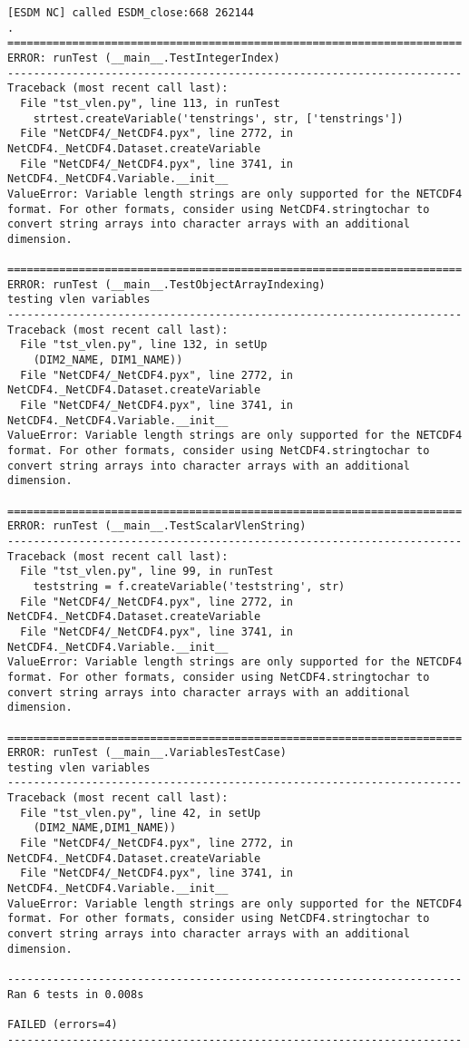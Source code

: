 \begin{verbatim}
[ESDM NC] called ESDM_close:668 262144
.
======================================================================
ERROR: runTest (__main__.TestIntegerIndex)
----------------------------------------------------------------------
Traceback (most recent call last):
  File "tst_vlen.py", line 113, in runTest
    strtest.createVariable('tenstrings', str, ['tenstrings'])
  File "NetCDF4/_NetCDF4.pyx", line 2772, in NetCDF4._NetCDF4.Dataset.createVariable
  File "NetCDF4/_NetCDF4.pyx", line 3741, in NetCDF4._NetCDF4.Variable.__init__
ValueError: Variable length strings are only supported for the NETCDF4 format. For other formats, consider using NetCDF4.stringtochar to convert string arrays into character arrays with an additional dimension.

======================================================================
ERROR: runTest (__main__.TestObjectArrayIndexing)
testing vlen variables
----------------------------------------------------------------------
Traceback (most recent call last):
  File "tst_vlen.py", line 132, in setUp
    (DIM2_NAME, DIM1_NAME))
  File "NetCDF4/_NetCDF4.pyx", line 2772, in NetCDF4._NetCDF4.Dataset.createVariable
  File "NetCDF4/_NetCDF4.pyx", line 3741, in NetCDF4._NetCDF4.Variable.__init__
ValueError: Variable length strings are only supported for the NETCDF4 format. For other formats, consider using NetCDF4.stringtochar to convert string arrays into character arrays with an additional dimension.

======================================================================
ERROR: runTest (__main__.TestScalarVlenString)
----------------------------------------------------------------------
Traceback (most recent call last):
  File "tst_vlen.py", line 99, in runTest
    teststring = f.createVariable('teststring', str)
  File "NetCDF4/_NetCDF4.pyx", line 2772, in NetCDF4._NetCDF4.Dataset.createVariable
  File "NetCDF4/_NetCDF4.pyx", line 3741, in NetCDF4._NetCDF4.Variable.__init__
ValueError: Variable length strings are only supported for the NETCDF4 format. For other formats, consider using NetCDF4.stringtochar to convert string arrays into character arrays with an additional dimension.

======================================================================
ERROR: runTest (__main__.VariablesTestCase)
testing vlen variables
----------------------------------------------------------------------
Traceback (most recent call last):
  File "tst_vlen.py", line 42, in setUp
    (DIM2_NAME,DIM1_NAME))
  File "NetCDF4/_NetCDF4.pyx", line 2772, in NetCDF4._NetCDF4.Dataset.createVariable
  File "NetCDF4/_NetCDF4.pyx", line 3741, in NetCDF4._NetCDF4.Variable.__init__
ValueError: Variable length strings are only supported for the NETCDF4 format. For other formats, consider using NetCDF4.stringtochar to convert string arrays into character arrays with an additional dimension.

----------------------------------------------------------------------
Ran 6 tests in 0.008s

FAILED (errors=4)
----------------------------------------------------------------------
\end{verbatim}
